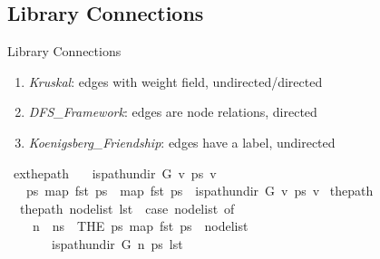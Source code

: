 \documentclass[%
	sans,
	12pt,
]{beamer}
\def\isacartoucheopen{}%
\def\isacartoucheclose{}%
\begin{document}
\subsection{Library Connections}
\begin{frame}{Library Connections}\pause
\vspace{3mm}
\begin{enumerate}
	\item \textit{Kruskal}: edges with weight field, undirected/directed\pause
	\item \textit{DFS\_Framework}: edges are node relations, directed\pause
	\item \textit{Koenigsberg\_Friendship}: edges have a label, undirected\pause
\end{enumerate}
\begin{isabelle}
\isamarkupfalse%
\ ex{}{\isacharunderscore}the{\isacharunderscore}path{\isacharcolon}\isanewline
\ \ \ {\isacartoucheopen}is{\isacharunderscore}path{\isacharunderscore}undir\ G\ v\ ps\ v{\isacharprime}{\isacartoucheclose}\isanewline
\ \ \ {\isacartoucheopen}{\isasymexists}{\isacharbang}ps{\isacharprime}{\isachardot}\ map\ fst\ ps{\isacharprime}\ {\isacharequal}\ map\ fst\ ps\ {\isasymand}\ is{\isacharunderscore}path{\isacharunderscore}undir\ G\ v\ ps{\isacharprime}\ v{\isacharprime}{\isacartoucheclose}
\isanewline \pause
\isanewline
	\isamarkupfalse%
	\ the{\isacharunderscore}path\ \isanewline
	\ \ {\isacartoucheopen}the{\isacharunderscore}path\ nodelist\ lst\ {\isacharequal}\ {\isacharparenleft}case\ nodelist\ of\isanewline
	\ \ \ \ {\isacharbrackleft}{\isacharbrackright}\ {\isasymRightarrow}\ {\isacharbrackleft}{\isacharbrackright}\ {\isacharbar}\isanewline
	\ \ \ \ n\ {\isacharhash}\ ns\ {\isasymRightarrow}\ THE\ ps{\isachardot}\ map\ fst\ ps\ {\isacharequal}\ nodelist\\\ \ \ \ \ \ {\isasymand}\ is{\isacharunderscore}path{\isacharunderscore}undir\ G\ n\ ps\ lst{\isacharparenright}{\isacartoucheclose}
\end{isabelle}

\end{frame}
\end{document}
